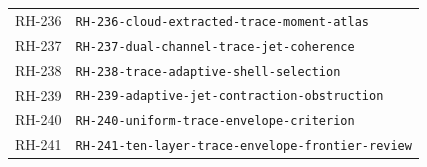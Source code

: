 \begin{longtable}{r >{\raggedright\arraybackslash}p{}}
RH-236 & \texttt{RH-\allowbreak{}236-\allowbreak{}cloud-\allowbreak{}extracted-\allowbreak{}trace-\allowbreak{}moment-\allowbreak{}atlas}\\
RH-237 & \texttt{RH-\allowbreak{}237-\allowbreak{}dual-\allowbreak{}channel-\allowbreak{}trace-\allowbreak{}jet-\allowbreak{}coherence}\\
RH-238 & \texttt{RH-\allowbreak{}238-\allowbreak{}trace-\allowbreak{}adaptive-\allowbreak{}shell-\allowbreak{}selection}\\
RH-239 & \texttt{RH-\allowbreak{}239-\allowbreak{}adaptive-\allowbreak{}jet-\allowbreak{}contraction-\allowbreak{}obstruction}\\
RH-240 & \texttt{RH-\allowbreak{}240-\allowbreak{}uniform-\allowbreak{}trace-\allowbreak{}envelope-\allowbreak{}criterion}\\
RH-241 & \texttt{RH-\allowbreak{}241-\allowbreak{}ten-\allowbreak{}layer-\allowbreak{}trace-\allowbreak{}envelope-\allowbreak{}frontier-\allowbreak{}review}\\
\bottomrule
\end{longtable}

